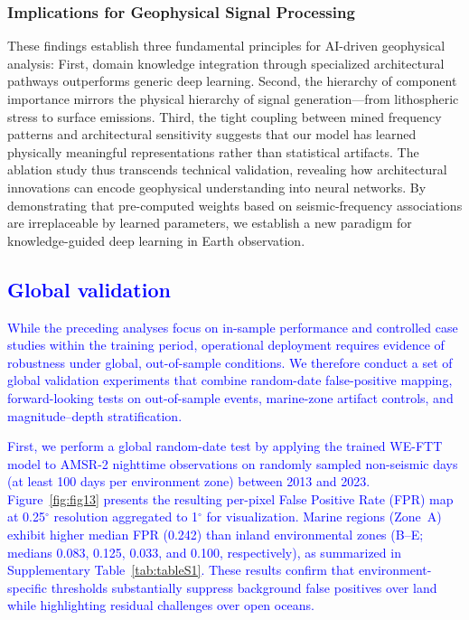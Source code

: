\documentclass[preprint,review,12pt,authoryear]{elsarticle}
\providecommand{\DIFaddtex}[1]{{\sf #1}} %
\providecommand{\DIFaddbegin}{} %
\providecommand{\DIFadd}[1]{\texorpdfstring{\DIFaddtex{#1}}{#1}} %
\newcommand{\DIFaddincludegraphics}[2][]{{\color{blue}\fbox{\DIFOincludegraphics[#1]{#2}}}} %
\DeclareRobustCommand{\DIFaddbegin}{\DIFOaddbegin \let\includegraphics\DIFaddincludegraphics} %
\renewcommand{\DIFaddtex}[1]{\textcolor{blue}{#1}}
\begin{document}
\subsubsection{Implications for Geophysical Signal Processing} 
These findings establish three fundamental principles for AI-driven geophysical analysis: First, domain knowledge integration through specialized architectural pathways outperforms generic deep learning. Second, the hierarchy of component importance mirrors the physical hierarchy of signal generation---from lithospheric stress to surface emissions. Third, the tight coupling between mined frequency patterns and architectural sensitivity suggests that our model has learned physically meaningful representations rather than statistical artifacts.
The ablation study thus transcends technical validation, revealing how architectural innovations can encode geophysical understanding into neural networks. By demonstrating that pre-computed weights based on seismic-frequency associations are irreplaceable by learned parameters, we establish a new paradigm for knowledge-guided deep learning in Earth observation.

\DIFaddbegin \subsection{\DIFadd{Global validation}}
\DIFadd{While the preceding analyses focus on in-sample performance and controlled case studies within the training period, operational deployment requires evidence of robustness under global, out-of-sample conditions. We therefore conduct a set of global validation experiments that combine random-date false-positive mapping, forward-looking tests on out-of-sample events, marine-zone artifact controls, and magnitude--depth stratification.
}

\DIFadd{First, we perform a global random-date test by applying the trained WE-FTT model to AMSR-2 nighttime observations on randomly sampled non-seismic days (at least 100 days per environment zone) between 2013 and 2023. Figure~\ref{fig:fig13} presents the resulting per-pixel False Positive Rate (FPR) map at 0.25$^{\circ}$ resolution aggregated to 1$^{\circ}$ for visualization. Marine regions (Zone~A) exhibit higher median FPR (0.242) than inland environmental zones (B--E; medians 0.083, 0.125, 0.033, and 0.100, respectively), as summarized in Supplementary Table~\ref{tab:tableS1}. These results confirm that environment-specific thresholds substantially suppress background false positives over land while highlighting residual challenges over open oceans.
}
\end{document}
